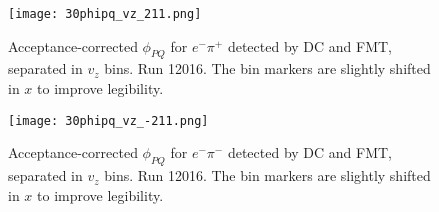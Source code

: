     \begin{figure}
        \centering
        \texttt{[image: 30phipq\_vz\_211.png]}
        \caption[Acceptance-corrected $\phi_{PQ}$ for $e^-\pi^+$ separated in $v_z$ bins, run 12016]
        {Acceptance-corrected $\phi_{PQ}$ for $e^-\pi^+$ detected by DC and FMT, separated in $v_z$ bins.
        Run 12016.
        The bin markers are slightly shifted in $x$ to improve legibility.}
        \label{fig::14.30::phipq_211_vz}
    \end{figure}

    \begin{figure}
        \centering
        \texttt{[image: 30phipq\_vz\_-211.png]}
        \caption[Acceptance-corrected $\phi_{PQ}$ for $e^-\pi^-$ separated in $v_z$ bins, run 12016]
        {Acceptance-corrected $\phi_{PQ}$ for $e^-\pi^-$ detected by DC and FMT, separated in $v_z$ bins.
        Run 12016.
        The bin markers are slightly shifted in $x$ to improve legibility.}
        \label{fig::14.30::phipq_-211_vz}
    \end{figure}

